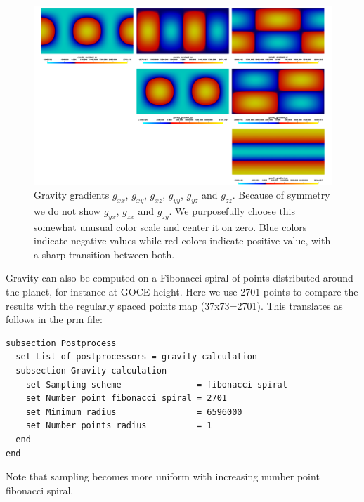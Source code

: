 \begin{figure}[h!]
\centering
\includegraphics[scale=0.64]{../../benchmarks/gravity_prem/doc/gradient_prem_map.jpg}
\caption{Gravity gradients $g_{xx}$, $g_{xy}$, $g_{xz}$, $g_{yy}$, $g_{yz}$ and $g_{zz}$. Because of symmetry we do not show $g_{yx}$, $g_{zx}$ and $g_{zy}$. We purposefully choose this somewhat unusual color scale and center it on zero. Blue colors indicate negative values while red colors indicate positive value, with a sharp transition between both.}
\label{fig:gravitymapfull2}
\end{figure}

Gravity can also be computed on a Fibonacci spiral of points distributed around the planet, for instance at GOCE height. Here we use 2701 points to compare the results with the regularly spaced points map (37x73=2701). This translates as follows in the prm file:

\begin{lstlisting}
subsection Postprocess
  set List of postprocessors = gravity calculation
  subsection Gravity calculation
    set Sampling scheme               = fibonacci spiral
    set Number point fibonacci spiral = 2701
    set Minimum radius                = 6596000 
    set Number points radius          = 1
  end
end
\end{lstlisting}

Note that sampling becomes more uniform with increasing number point fibonacci spiral.

